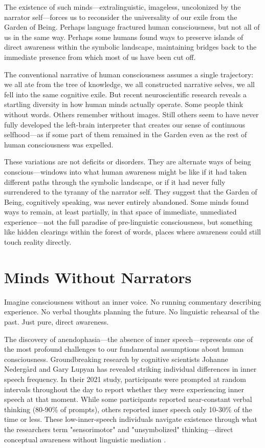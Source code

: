 The existence of such minds—extralinguistic, imageless, uncolonized by the narrator self—forces us to reconsider the universality of our exile from the Garden of Being. Perhaps language fractured human consciousness, but not all of us in the same way. Perhaps some humans found ways to preserve islands of direct awareness within the symbolic landscape, maintaining bridges back to the immediate presence from which most of us have been cut off.

The conventional narrative of human consciousness assumes a single trajectory: we all ate from the tree of knowledge, we all constructed narrative selves, we all fell into the same cognitive exile. But recent neuroscientific research reveals a startling diversity in how human minds actually operate. Some people think without words. Others remember without images. Still others seem to have never fully developed the left-brain interpreter that creates our sense of continuous selfhood—as if some part of them remained in the Garden even as the rest of human consciousness was expelled.

These variations are not deficits or disorders. They are alternate ways of being conscious—windows into what human awareness might be like if it had taken different paths through the symbolic landscape, or if it had never fully surrendered to the tyranny of the narrator self. They suggest that the Garden of Being, cognitively speaking, was never entirely abandoned. Some minds found ways to remain, at least partially, in that space of immediate, unmediated experience—not the full paradise of pre-linguistic consciousness, but something like hidden clearings within the forest of words, places where awareness could still touch reality directly.

\section{Minds Without Narrators}

Imagine consciousness without an inner voice.
No running commentary describing experience.
No verbal thoughts planning the future.
No linguistic rehearsal of the past.
Just pure, direct awareness.

The discovery of anendophasia—the absence of inner speech—represents one of the most profound challenges to our fundamental assumptions about human consciousness. Groundbreaking research by cognitive scientists Johanne Nedergård and Gary Lupyan has revealed striking individual differences in inner speech frequency. In their 2021 study, participants were prompted at random intervals throughout the day to report whether they were experiencing inner speech at that moment. While some participants reported near-constant verbal thinking (80-90\% of prompts), others reported inner speech only 10-30\% of the time or less. These low-inner-speech individuals navigate existence through what the researchers term "sensorimotor" and "unsymbolized" thinking—direct conceptual awareness without linguistic mediation \parencite{nedergaard2021inner}.

